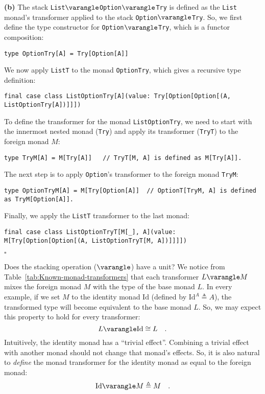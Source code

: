 \textbf{(b)} The stack \lstinline!List!$\varangle$\lstinline!Option!$\varangle$\lstinline!Try!
is defined as the \lstinline!List! monad\textsf{'}s transformer applied to
the stack \lstinline!Option!$\varangle$\lstinline!Try!. So, we
first define the type constructor for \lstinline!Option!$\varangle$\lstinline!Try!,
which is a functor composition:
\begin{lstlisting}
type OptionTry[A] = Try[Option[A]]
\end{lstlisting}
We now apply \lstinline!ListT! to the monad \lstinline!OptionTry!,
which gives a recursive type definition:
\begin{lstlisting}
final case class ListOptionTry[A](value: Try[Option[Option[(A, ListOptionTry[A])]]])
\end{lstlisting}

To define the transformer for the monad \lstinline!ListOptionTry!,
we need to start with the innermost nested monad (\lstinline!Try!)
and apply its transformer (\lstinline!TryT!) to the foreign monad
$M$:
\begin{lstlisting}
type TryM[A] = M[Try[A]]   // TryT[M, A] is defined as M[Try[A]].
\end{lstlisting}
The next step is to apply \lstinline!Option!\textsf{'}s transformer to the
foreign monad \lstinline!TryM!:
\begin{lstlisting}
type OptionTryM[A] = M[Try[Option[A]]  // OptionT[TryM, A] is defined as TryM[Option[A]].
\end{lstlisting}
Finally, we apply the \lstinline!ListT! transformer to the last monad:
\begin{lstlisting}
final case class ListOptionTryT[M[_], A](value: M[Try[Option[Option[(A, ListOptionTryT[M, A])]]]])
\end{lstlisting}
$\square$

Does the stacking operation ($\varangle$) have a unit? We notice
from Table~\ref{tab:Known-monad-transformers} that each transformer
$L\varangle M$ mixes the foreign monad $M$ with the type of the
base monad $L$. In every example, if we set $M$ to the identity
monad $\text{Id}$ (defined by $\text{Id}^{A}\triangleq A$), the
transformed type will become equivalent to the base monad $L$. So,
we may expect this property to hold for every transformer:
\[
L\varangle\text{Id}\cong L\quad.
\]
Intuitively, the identity monad has a \textsf{``}trivial effect\textsf{''}. Combining
a trivial effect with another monad should not change that monad\textsf{'}s
effects. So, it is also natural to \emph{define} the monad transformer
for the identity monad as equal to the foreign monad:
\[
\text{Id}\varangle M\triangleq M\quad.
\]

